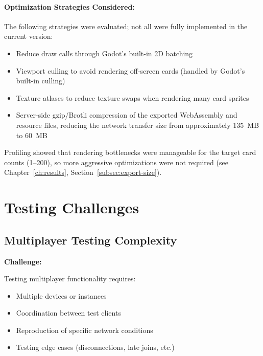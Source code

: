 \paragraph*{Optimization Strategies Considered:}

The following strategies were evaluated; not all were fully implemented in the current version:
\begin{itemize}
    \item Reduce draw calls through Godot's built-in 2D batching
    \item Viewport culling to avoid rendering off-screen cards (handled by Godot's built-in culling)
    \item Texture atlases to reduce texture swaps when rendering many card sprites
    \item Server-side gzip/Brotli compression of the exported WebAssembly and resource files, reducing the network transfer size from approximately 135~MB to 60~MB
\end{itemize}

Profiling showed that rendering bottlenecks were manageable for the target card counts (1--200), so more aggressive optimizations were not required (see Chapter~\ref{ch:results}, Section~\ref{subsec:export-size}).

\section{Testing Challenges}
\label{sec:testing-challenges}

\subsection{Multiplayer Testing Complexity}
\label{subsec:multiplayer-testing}

\textbf{Challenge:}

Testing multiplayer functionality requires:
\begin{itemize}
    \item Multiple devices or instances
    \item Coordination between test clients
    \item Reproduction of specific network conditions
    \item Testing edge cases (disconnections, late joins, etc.)
\end{itemize}

